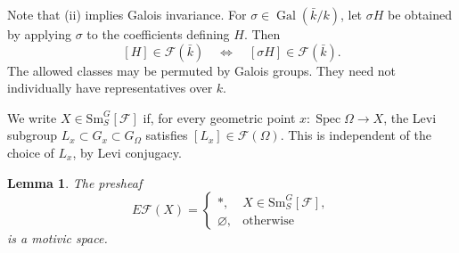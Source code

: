 \documentclass[11pt,reqno]{amsart}
\newtheorem{lemma}[theorem]{Lemma}
\theoremstyle{definition}
\theoremstyle{remark}
\theoremstyle{plain}
\numberwithin{equation}{section}
\newcommand{\Sm}{\mathrm{Sm}}
\newcommand{\F}{\mathcal F}
\begin{document}
Note that (ii) implies Galois invariance.
For \(\sigma\in\operatorname{Gal}(\bar k/k)\), let \(\sigma H\)
be obtained by applying \(\sigma\) to the coefficients defining \(H\).
Then
\[
 [H]\in\F(\bar k)
 \quad\Longleftrightarrow\quad
 [\sigma H]\in\F(\bar k).
\]
The allowed classes may be permuted by Galois groups. They need not
individually have representatives over \(k\).

We write \(X\in\Sm^G_S[\F]\) if, for every geometric point
\(x:\operatorname{Spec}\Omega\to X\), the Levi subgroup
\(L_x\subset G_x\subset G_\Omega\) satisfies
\([L_x]\in\F(\Omega)\).
This is independent of the choice of \(L_x\), by Levi conjugacy.

\begin{lemma}\label{lem:family-motivic}
The presheaf
\[
 E\F(X)=
 \begin{cases}
 *,&X\in\Sm^G_S[\F],\\
 \varnothing,&\text{otherwise}
 \end{cases}
\]
is a motivic space.
\end{lemma}
\end{document}
